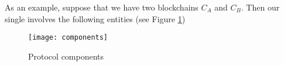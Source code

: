 As an example, suppose that we have two blockchains $C_{A}$ and $C_{B}$. Then our single \dprotocol involves the following entities (see Figure \ref{protocol-components})
\begin{figure}[!ht]
\centerline{\texttt{[image: components]}}
\caption{Protocol components}
\label{protocol-components}
\end{figure}


